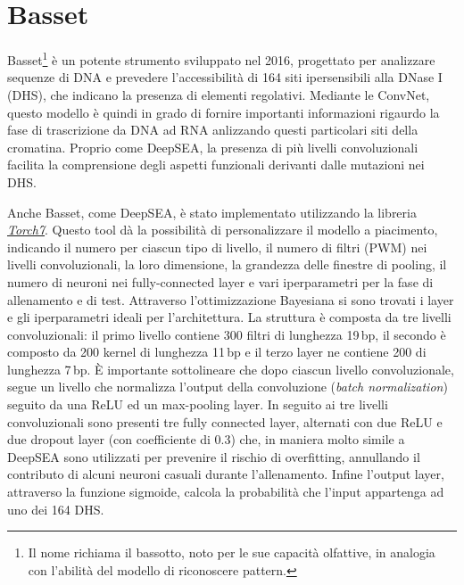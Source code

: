 \begin{comment}
Ogni training sample consisteva nel 1000\,bp sequences, centrata sul frammento (bin) di 200 basi ed associata al vettore di etichette che ontiene le 919 features. In questo modo, le due sequenze di 400 \,bp ai lati davaano più contesto in modo da interpretare meglio il risultato.

\end{comment}






\section{Basset}\label{sec:Basset}
% 
Basset\footnote{Il nome richiama il bassotto, noto per le sue capacità olfattive, in analogia con l'abilità del modello di riconoscere pattern.} è un potente strumento sviluppato nel 2016, progettato per analizzare sequenze di DNA e prevedere l'accessibilità di 164 siti ipersensibili alla DNase I (\acs{DHS}), che indicano la presenza di elementi regolativi. Mediante le \acs{ConvNet}, questo modello è quindi in grado di fornire importanti informazioni rigaurdo la fase di trascrizione da \acs{DNA} ad \acs{RNA} anlizzando questi particolari siti della cromatina. Proprio come DeepSEA, la presenza di più livelli convoluzionali facilita la comprensione degli aspetti funzionali derivanti dalle mutazioni nei \acs{DHS}.

Anche Basset, come DeepSEA, è stato implementato utilizzando la libreria \href{https://github.com/torch/torch7}{\textsl{Torch7}}. Questo tool dà la possibilità di personalizzare il modello a piacimento, indicando il numero per ciascun tipo di livello, il numero di filtri (\acs{PWM}) nei livelli convoluzionali, la loro dimensione, la grandezza delle finestre di pooling, il numero di neuroni nei fully-connected layer e vari iperparametri per la fase di allenamento e di test. Attraverso l'ottimizzazione Bayesiana si sono trovati i layer e gli iperparametri ideali per l'architettura. La struttura è composta da tre livelli convoluzionali: il primo livello contiene 300 filtri di lunghezza 19\,bp, il secondo è composto da 200 kernel di lunghezza 11\,bp e il terzo layer ne contiene 200 di lunghezza 7\,bp. È importante sottolineare che dopo ciascun livello convoluzionale, segue un livello che normalizza l'output della convoluzione (\textit{batch normalization}) seguito da una \acs{ReLU} ed un max-pooling layer. In seguito ai tre livelli convoluzionali sono presenti tre fully connected layer, alternati con due \acs{ReLU} e due dropout layer (con coefficiente di 0.3) che, in maniera molto simile a DeepSEA sono utilizzati per prevenire il rischio di overfitting, annullando il contributo di alcuni neuroni casuali durante l'allenamento. Infine l'output layer, attraverso la funzione sigmoide, calcola la probabilità che l'input appartenga ad uno dei 164 \acs{DHS}.

